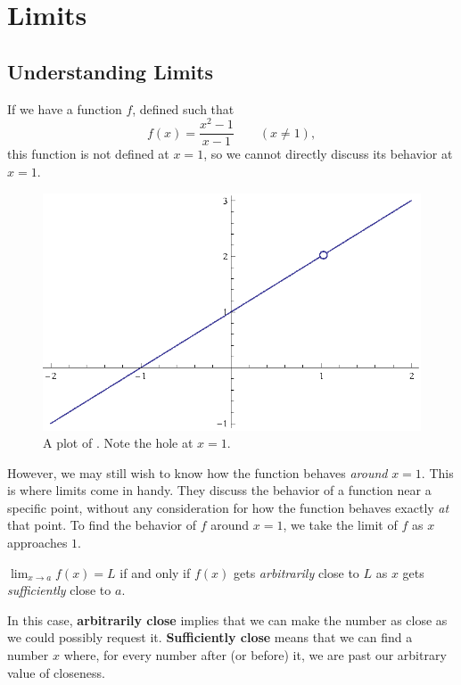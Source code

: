 \chapter{Limits}\label{ch:limits} 
\section{Understanding Limits}
If we have a function \(f\), defined such that
\begin{equation}
  f(x)=\frac{x^2-1}{x-1} \qquad (x \neq 1),
  \label{eq:firstlimit}
\end{equation}
this function is not defined at \(x=1\), so we cannot directly discuss its behavior at \(x=1\).
\begin{figure}[h]
  \begin{center}
    \includegraphics[scale=0.7]{graphs/p1ch3x2m1xm1}
  \end{center}
  \caption{A plot of . Note the hole at \(x=1\).}
\end{figure}
However, we may still wish to know how the function behaves \emph{around} \(x=1\).
This is where limits come in handy.
They discuss the behavior of a function near a specific point, without any consideration for how the function behaves exactly \emph{at} that point.
To find the behavior of \(f\) around \(x=1\), we take the limit of \(f\) as \(x\) approaches \(1\).
\begin{defn}\label{defn:limit}
  \( \lim_{x \to a} f(x) = L \) if and only if \(f(x)\) gets \emph{arbitrarily} close to \( L \) as \(x\) gets \emph{sufficiently} close to \(a\).
\end{defn}
  In this case, \textbf{arbitrarily close} implies that we can make the number as close as we could possibly request it. \textbf{Sufficiently close} means that we can find a number $x$ where, for every number after (or before) it, we are past our arbitrary value of closeness.
